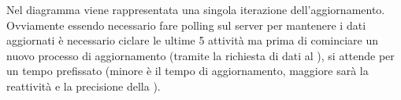 \begin{enumerate}
            Nel diagramma viene rappresentata una singola iterazione dell'aggiornamento. Ovviamente essendo necessario fare polling sul server per mantenere i dati aggiornati è necessario ciclare le ultime 5 attività ma prima di cominciare un nuovo processo di aggiornamento (tramite la richiesta di dati al  ), si attende per un tempo prefissato (minore è il tempo di aggiornamento, maggiore sarà la reattività e la precisione della ).
        \end{enumerate}